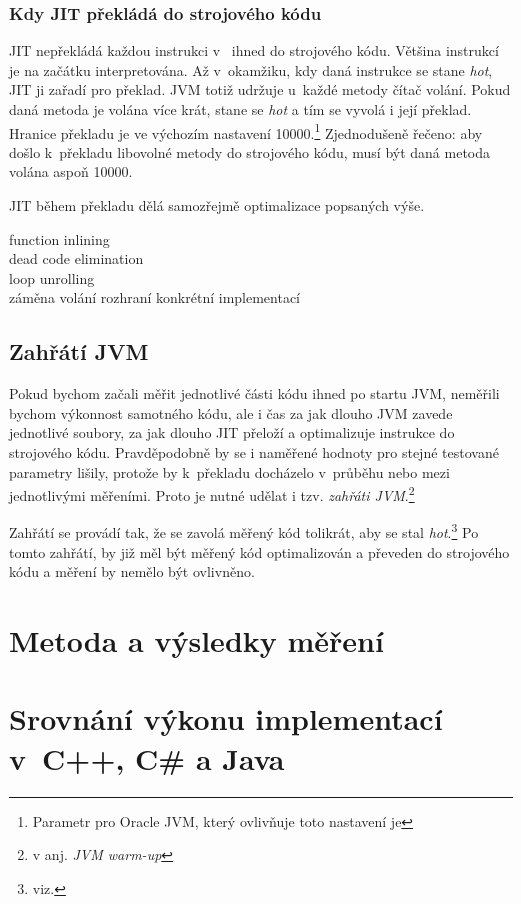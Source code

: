 \subsubsection{Kdy JIT překládá do strojového kódu\label{subsub:whenJIT}}
JIT nepřekládá každou instrukci v~\bytecode{} ihned do strojového kódu. Většina instrukcí je na začátku interpretována. Až v~okamžiku, kdy daná instrukce se stane \emph{hot}, JIT ji zařadí pro překlad. JVM totiž udržuje u~každé metody čítač volání. Pokud daná metoda je volána více krát, stane se \emph{hot} a tím se vyvolá i její překlad. Hranice překladu je ve výchozím nastavení 10000.\footnote{Parametr pro Oracle JVM, který ovlivňuje toto nastavení je } Zjednodušeně řečeno: aby došlo k~překladu libovolné metody do strojového kódu, musí být daná metoda volána aspoň 10000.

JIT během překladu dělá samozřejmě optimalizace popsaných výše.

\begin{description}
\item[function inlining] 
\item[dead code elimination]
\item[loop unrolling]
\item[záměna volání rozhraní konkrétní implementací]
\end{description}

\subsection{Zahřátí JVM}

Pokud bychom začali měřit jednotlivé části kódu ihned po startu JVM, neměřili bychom výkonnost samotného kódu, ale i čas za jak dlouho JVM zavede jednotlivé \classfile soubory, za jak dlouho JIT přeloží a optimalizuje instrukce \bytecode{} do strojového kódu. Pravděpodobně by se i naměřené hodnoty pro stejné testované parametry lišily, protože by k~překladu docházelo v~průběhu nebo mezi jednotlivými měřeními. Proto je nutné udělat i tzv. \emph{zahřáti JVM}.\footnote{v anj. \emph{JVM warm-up}}

Zahřátí se provádí tak, že se zavolá měřený kód tolikrát, aby se stal \emph{hot}.\footnote{viz. } Po tomto zahřátí, by již měl být měřený kód optimalizován a převeden do strojového kódu a měření by nemělo být ovlivněno.

\section{Metoda a výsledky měření}

\section{Srovnání výkonu implementací v~C++, C\# a Java}
